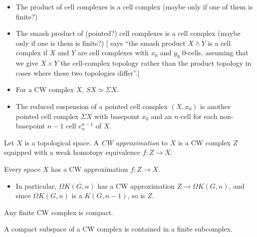\documentclass{MetricNotes2023}
\begin{document}
\begin{itemize}
\item The product of cell complexes is a cell complex (maybe only if one of them is finite?)
\item The smash product of (pointed?) cell complexes is a cell complex (maybe only if one is them is finite?) [\autocite{hatcher} says ``the smash product \(X\wedge Y\) is a cell complex if \(X\) and \(Y\) are cell complexes with \(x_0\) and \(y_0\) \(0\)-cells, assuming that we give \(X\times Y\) the cell-complex topology rather than the product topology in cases where these two topologies differ''.]
\item For a CW complex \(X\), \(SX\simeq \Sigma X\).
\item The reduced suspension of a pointed cell complex \((X, x_0)\) is another pointed cell complex \(\Sigma X\) with basepoint \(x_0\) and an \(n\)-cell for each non-basepoint \(n-1\) cell \(e^{n-1}_\alpha\) of \(X\).
\end{itemize}

\begin{definition}
Let \(X\) is a topological space. A \textit{CW approximation} to \(X\) is a CW complex \(Z\) equipped with a weak homotopy equivalence \(f : Z \to X\).
\end{definition}

\begin{theorem}
Every space \(X\) has a CW approximation \(f : Z \to X\). %
\end{theorem}

\begin{itemize}
\item In particular, \(\Omega K(G, n)\) has a CW approximation \(Z \to \Omega K(G, n)\), and since \(\Omega K(G,n)\) is a \(K(G,n-1)\), so is \(Z\). 
\end{itemize}

Any finite CW complex is compact.

\begin{proposition}\label{25004081110}
A compact subspace of a CW complex is contained in a finite subcomplex.
\end{proposition}
\end{document}
